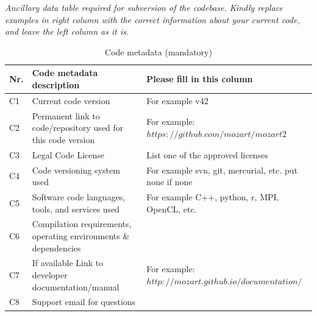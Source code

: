\documentclass[preprint,12pt, a4paper]{elsarticle}
\begin{document}
{\em Ancillary data table required for subversion of the codebase. Kindly
replace examples in right column with the correct information about your
current code, and leave the left column as it is.

\begin{table}[!ht]
\begin{tabular}{|l|p{6.5cm}|p{6.5cm}|}
\hline
\textbf{Nr.}                                                     & 
\textbf{Code metadata description}                               & 
\textbf{Please fill in this column}                              \\
\hline
C1                                                               & 
Current code version                                             & 
For example v42                                                  \\
\hline
C2                                                               & 
Permanent link to code/repository used for this code version     & 
For example: $https://github.com/mozart/mozart2$                 \\
\hline
C3                                                               & 
Legal Code License                                               & 
List one of the approved licenses                                \\
\hline
C4                                                               & 
Code versioning system used                                      & 
For example svn, git, mercurial, etc. put none if none           \\
\hline
C5                                                               & 
Software code languages, tools, and services used                & 
For example C++, python, r, MPI, OpenCL, etc.                    \\
\hline
C6                                                               & 
Compilation requirements, operating environments \& dependencies & 
                                                                 \\
\hline
C7                                                               & 
If available Link to developer documentation/manual              & 
For example: $http://mozart.github.io/documentation/$            \\
\hline
C8                                                               & 
Support email for questions                                      & 
                                                                 \\
\hline
\end{tabular}
\caption{Code metadata (mandatory)}\label{tab:src_metadata} 
\end{table}}
\end{document}
